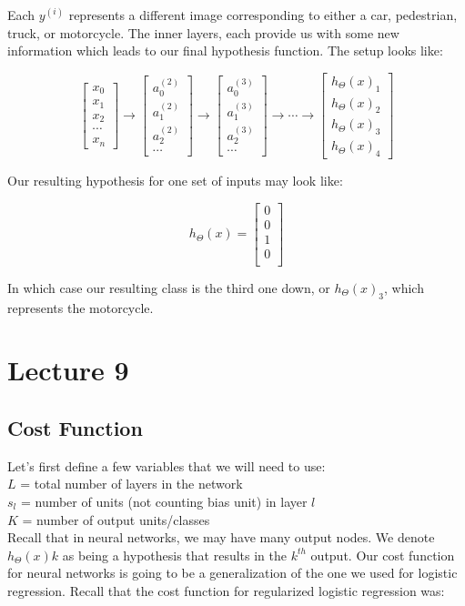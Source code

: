 \documentclass[UTF8]{article}
\begin{document}
Each $y^{(i)}$ represents a different image corresponding to either a car, pedestrian, truck, or motorcycle. The inner layers, each provide us with some new information which leads to our final hypothesis function. The setup looks like:

$$\begin{bmatrix}x_0 \\ x_1 \\ x_2 \\ \cdots \\ x_n \end{bmatrix} \rightarrow \begin{bmatrix}a^{(2)}_0 \\ a^{(2)}_1 \\ a^{(2)}_2 \\ \cdots \end{bmatrix} \rightarrow \begin{bmatrix}a^{(3)}_0 \\ a^{(3)}_1 \\ a^{(3)}_2 \\ \cdots \end{bmatrix} \rightarrow \cdots \rightarrow \begin{bmatrix}h_\Theta(x)_1 \\ h_\Theta(x)_2 \\ h_\Theta(x)_3 \\ h_\Theta(x)_4 \end{bmatrix}$$

Our resulting hypothesis for one set of inputs may look like:

$$h_\Theta(x) =\begin{bmatrix}0 \\ 0 \\ 1 \\ 0 \\\end{bmatrix}$$

In which case our resulting class is the third one down, or $h_\Theta(x)_3$, which represents the motorcycle.

\section{Lecture 9}

\subsection{Cost Function}

Let's first define a few variables that we will need to use:
\\
$L$ = total number of layers in the network
\\
$s_l$ = number of units (not counting bias unit) in layer $l$
\\
$K$ = number of output units/classes
\\
Recall that in neural networks, we may have many output nodes. We denote $h_\Theta(x)k$ as being a hypothesis that results in the $k^{th}$ output. Our cost function for neural networks is going to be a generalization of the one we used for logistic regression. Recall that the cost function for regularized logistic regression was:
\end{document}
